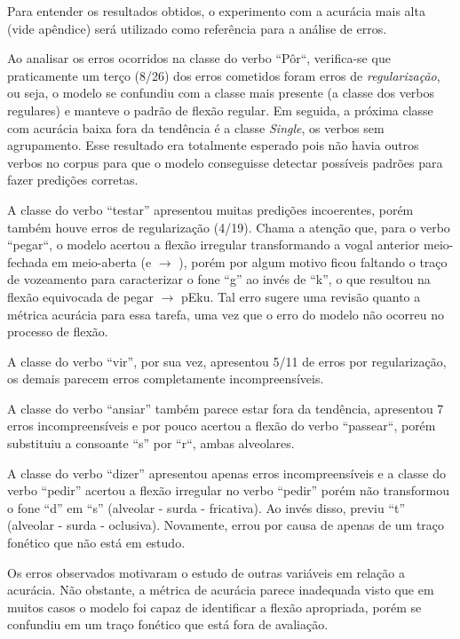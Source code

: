 Para entender os resultados obtidos, o experimento com a acurácia mais alta (vide apêndice) será utilizado como referência para a análise de erros.

Ao analisar os erros ocorridos na classe do verbo “Pôr“, verifica-se que praticamente um terço (8/26) dos erros cometidos foram erros de \textit{regularização}, ou seja, o modelo se confundiu com a classe mais presente (a classe dos verbos regulares) e manteve o padrão de flexão regular. 
Em seguida, a próxima classe com acurácia baixa fora da tendência é a classe \textit{Single}, os verbos sem agrupamento. Esse resultado era totalmente esperado pois não havia outros verbos no corpus para que o modelo conseguisse detectar possíveis padrões para fazer predições corretas. 

A classe do verbo “testar” apresentou muitas predições incoerentes, porém também houve erros de regularização (4/19). Chama a atenção que, para o verbo “pegar“, o modelo acertou a flexão irregular transformando a vogal anterior meio-fechada em meio-aberta (e $\rightarrow$ \textepsilon), porém por algum motivo ficou faltando o traço de vozeamento para caracterizar o fone “g” ao invés de “k”, o que resultou na flexão equivocada de pegar $\rightarrow$ pEku.
Tal erro sugere uma revisão quanto a métrica acurácia para essa tarefa, uma vez que o erro do modelo não ocorreu no processo de flexão.

A classe do verbo “vir”, por sua vez, apresentou 5/11 de erros por regularização, os demais parecem erros completamente incompreensíveis.

A classe do verbo “ansiar” também parece estar fora da tendência, apresentou 7 erros incompreensíveis e por pouco acertou a flexão do verbo “passear“, porém substituiu a consoante “s” por “r“, ambas alveolares. 

A classe do verbo “dizer” apresentou apenas erros incompreensíveis e a classe do verbo “pedir” acertou a flexão irregular no verbo “pedir” porém não transformou o fone “d” em “s” (alveolar - surda - fricativa). Ao invés disso, previu “t” (alveolar - surda - oclusiva). Novamente, errou por causa de apenas de um traço fonético que não está em estudo.

Os erros observados motivaram o estudo de outras variáveis em relação a acurácia. Não obstante, a métrica de acurácia parece inadequada visto que em muitos casos o modelo foi capaz de identificar a flexão apropriada, porém se confundiu em um traço fonético que está fora de avaliação.


